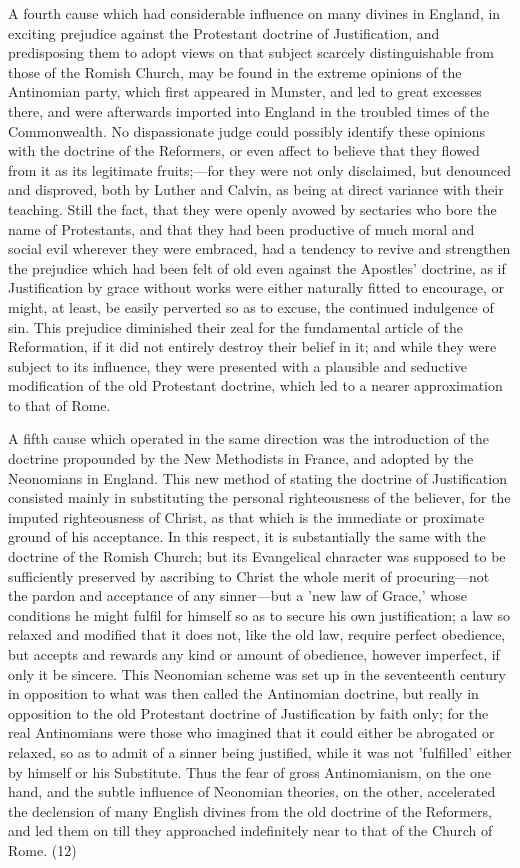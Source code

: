 \documentclass[
]{book}
\begin{document}
A fourth cause which had considerable influence on many divines in England, in exciting prejudice against the Protestant doctrine of Justification, and predisposing them to adopt views on that subject scarcely distinguishable from those of the Romish Church, may be found in the extreme opinions of the Antinomian party, which first appeared in Munster, and led to great excesses there, and were afterwards imported into England in the troubled times of the Commonwealth. No dispassionate judge could possibly identify these opinions with the doctrine of the Reformers, or even affect to believe that they flowed from it as its legitimate fruits;---for they were not only disclaimed, but denounced and disproved, both by Luther and Calvin, as being at direct variance with their teaching. Still the fact, that they were openly avowed by sectaries who bore the name of Protestants, and that they had been productive of much moral and social evil wherever they were embraced, had a tendency to revive and strengthen the prejudice which had been felt of old even against the Apostles' doctrine, as if Justification by grace without works were either naturally fitted to encourage, or might, at least, be easily perverted so as to excuse, the continued indulgence of sin. This prejudice diminished their zeal for the fundamental article of the Reformation, if it did not entirely destroy their belief in it; and while they were subject to its influence, they were presented with a plausible and seductive modification of the old Protestant doctrine, which led to a nearer approximation to that of Rome.

A fifth cause which operated in the same direction was the introduction of the doctrine propounded by the New Methodists in France, and adopted by the Neonomians in England. This new method of stating the doctrine of Justification consisted mainly in substituting the personal righteousness of the believer, for the imputed righteousness of Christ, as that which is the immediate or proximate ground of his acceptance. In this respect, it is substantially the same with the doctrine of the Romish Church; but its Evangelical character was supposed to be sufficiently preserved by ascribing to Christ the whole merit of procuring---not the pardon and acceptance of any sinner---but a 'new law of Grace,' whose conditions he might fulfil for himself so as to secure his own justification; a law so relaxed and modified that it does not, like the old law, require perfect obedience, but accepts and rewards any kind or amount of obedience, however imperfect, if only it be sincere. This Neonomian scheme was set up in the seventeenth century in opposition to what was then called the Antinomian doctrine, but really in opposition to the old Protestant doctrine of Justification by faith only; for the real Antinomians were those who imagined that it could either be abrogated or relaxed, so as to admit of a sinner being justified, while it was not 'fulfilled' either by himself or his Substitute. Thus the fear of gross Antinomianism, on the one hand, and the subtle influence of Neonomian theories, on the other, accelerated the declension of many English divines from the old doctrine of the Reformers, and led them on till they approached indefinitely near to that of the Church of Rome. (12)
\end{document}
